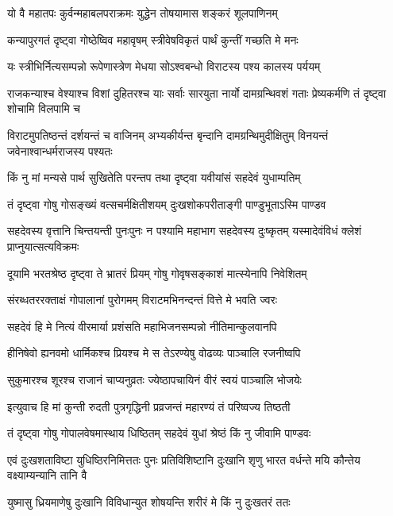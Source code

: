 \twolineshloka
{यो वै महातपः कुर्वन्महाबलपराक्रमः}
{युद्धेन तोषयामास शङ्करं शूलपाणिनम्}


\twolineshloka
{कन्यापुरगतं दृष्ट्वा गोष्ठेष्विव महावृषम्}
{स्त्रीवेषविकृतं पार्थं कुन्तीं गच्छति मे मनः}


\twolineshloka
{यः स्त्रीभिर्नित्यसम्पन्नो रूपेणास्त्रेण मेधया}
{सोऽश्वबन्धो विराटस्य पश्य कालस्य पर्ययम्}


\threelineshloka
{राजकन्याश्च वेश्याश्च विशां दुहितरश्च याः}
{सर्वाः सारयुता नार्यो दामग्रन्थिवशं गताः}
{प्रेष्यकर्मणि तं दृष्ट्वा शोचामि विलपामि च}


\threelineshloka
{विराटमुपतिष्ठन्तं दर्शयन्तं च वाजिनम्}
{अभ्यकीर्यन्त बृन्दानि दामग्रन्थिमुदीक्षितुम्}
{विनयन्तं जवेनाश्वान्धर्मराजस्य पश्यतः}


\twolineshloka
{किं नु मां मन्यसे पार्थ सुखितेति परन्तप}
{तथा दृष्ट्वा यवीयांसं सहदेवं युधाम्पतिम्}


\twolineshloka
{तं दृष्ट्वा गोषु गोसङ्ख्यं वत्सचर्मक्षितीशयम्}
{दुःखशोकपरीताङ्गी पाण्डुभूताऽस्मि पाण्डव}


\threelineshloka
{सहदेवस्य वृत्तानि चिन्तयन्ती पुनःपुनः}
{न पश्यामि महाभाग सहदेवस्य दुःष्कृतम्}
{यस्मादेवंविधं क्लेशं प्राप्नुयात्सत्यविक्रमः}


\twolineshloka
{दूयामि भरतश्रेष्ठ दृष्ट्वा ते भ्रातरं प्रियम्}
{गोषु गोवृषसङ्काशं मात्स्येनापि निवेशितम्}


\twolineshloka
{संरब्धतररक्ताक्षं गोपालानां पुरोगमम्}
{विराटमभिनन्दन्तं वित्ते मे भवति ज्वरः}


\twolineshloka
{सहदेवं हि मे नित्यं वीरमार्या प्रशंसति}
{महाभिजनसम्पन्नो नीतिमान्कुलवानपि}


\twolineshloka
{हीनिषेवो ह्यनवमो धार्मिकश्च प्रियश्च मे}
{स तेऽरण्येषु वोढव्यः पाञ्चालि रजनीष्वपि}


\twolineshloka
{सुकुमारश्च शूरश्च राजानं चाप्यनुव्रतः}
{ज्येष्ठापचायिनं वीरं स्वयं पाञ्चालि भोजयेः}


\twolineshloka
{इत्युवाच हि मां कुन्ती रुदती पुत्रगृद्धिनी}
{प्रव्रजन्तं महारण्यं तं परिष्वज्य तिष्ठती}


\twolineshloka
{तं दृष्ट्वा गोषु गोपालवेषमास्थाय धिष्ठितम्}
{सहदेवं युधां श्रेष्ठं किं नु जीवामि पाण्डवः}


\onelineshloka
{एवं दुःखशताविष्टा युधिष्ठिरनिमित्ततः}
\twolineshloka
{पुनः प्रतिविशिष्टानि दुःखानि शृणु भारत}
{वर्धन्ते मयि कौन्तेय वक्ष्याम्यन्यानि तानि वै}


\twolineshloka
{युष्मासु ध्रियमाणेषु दुःखानि विविधान्युत}
{शोषयन्ति शरीरं मे किं नु दुःखतरं ततः}


